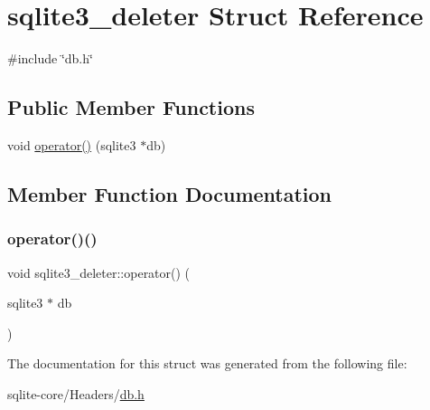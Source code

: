 \hypertarget{structsqlite3__deleter}{}\section{sqlite3\+\_\+deleter Struct Reference}
\label{structsqlite3__deleter}


{\ttfamily \#include \char`\"{}db.\+h\char`\"{}}

\subsection*{Public Member Functions}
\begin{DoxyCompactItemize}
\item 
void \mbox{\hyperlink{structsqlite3__deleter_a03feba9176a8e2e0c02d56ec8314018b}{operator()}} (sqlite3 $\ast$db)
\end{DoxyCompactItemize}


\subsection{Member Function Documentation}
\mbox{\label{structsqlite3__deleter_a03feba9176a8e2e0c02d56ec8314018b}} 
\subsubsection{\texorpdfstring{operator()()}{operator()()}}
{\footnotesize\ttfamily void sqlite3\+\_\+deleter\+::operator() (\begin{DoxyParamCaption}\item[{sqlite3 $\ast$}]{db }\end{DoxyParamCaption})\hspace{0.3cm}{\ttfamily [inline]}}



The documentation for this struct was generated from the following file\+:\begin{DoxyCompactItemize}
\item 
sqlite-\/core/\+Headers/\mbox{\hyperlink{db_8h}{db.\+h}}\end{DoxyCompactItemize}
